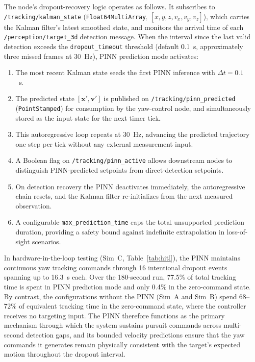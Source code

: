 \documentclass[11pt,letterpaper]{article}
\begin{document}
The node's dropout-recovery logic operates as follows.
It subscribes to \texttt{/tracking/kalman\_state}
(\texttt{Float64MultiArray}, $[x,y,z,v_x,v_y,v_z]$), which carries the
Kalman filter's latest smoothed state, and monitors the arrival time of
each \texttt{/perception/target\_3d} detection message.
When the interval since the last valid detection exceeds the
\texttt{dropout\_timeout} threshold (default 0.1~s, approximately three
missed frames at 30~Hz), PINN prediction mode activates:

\begin{enumerate}
    \item The most recent Kalman state seeds the first PINN inference
          with $\Delta t = 0.1$~s.
    \item The predicted state $[\mathbf{x}',\mathbf{v}']$ is published
          on \texttt{/tracking/pinn\_predicted} (\texttt{PointStamped})
          for consumption by the yaw-control node, and simultaneously
          stored as the input state for the next timer tick.
    \item This autoregressive loop repeats at 30~Hz, advancing the
          predicted trajectory one step per tick without any external
          measurement input.
    \item A Boolean flag on \texttt{/tracking/pinn\_active} allows
          downstream nodes to distinguish PINN-predicted setpoints from
          direct-detection setpoints.
    \item On detection recovery the PINN deactivates immediately, the
          autoregressive chain resets, and the Kalman filter
          re-initializes from the next measured observation.
    \item A configurable \texttt{max\_prediction\_time} caps the
          total unsupported prediction duration, providing a safety
          bound against indefinite extrapolation in loss-of-sight
          scenarios.
\end{enumerate}

In hardware-in-the-loop testing (Sim~C, Table~\ref{tab:hitl}), the PINN
maintains continuous yaw tracking commands through 16 intentional dropout
events spanning up to 16.3~s each.
Over the 180-second run, 77.5\% of total tracking time is spent in PINN
prediction mode and only 0.4\% in the zero-command state.
By contrast, the configurations without the PINN (Sim~A and Sim~B) spend
68--72\% of equivalent tracking time in the zero-command state, where the
controller receives no targeting input.
The PINN therefore functions as the primary mechanism through which the
system sustains pursuit commands across multi-second detection gaps, and
its bounded velocity predictions ensure that the yaw commands it generates
remain physically consistent with the target's expected motion throughout
the dropout interval.
\end{document}
